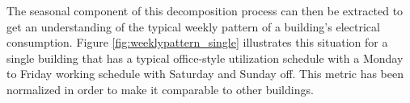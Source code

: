 The seasonal component of this decomposition process can then be extracted to get an understanding of the typical weekly pattern of a building's electrical consumption. Figure \ref{fig:weeklypattern_single} illustrates this situation for a single building that has a typical office-style utilization schedule with a Monday to Friday working schedule with Saturday and Sunday off. This metric has been normalized in order to make it comparable to other buildings.